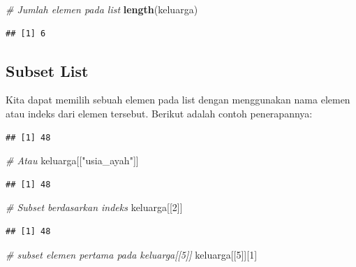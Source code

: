\documentclass[]{book}
\newenvironment{Shaded}{\begin{snugshade}}{\end{snugshade}}
\newcommand{\KeywordTok}[1]{\textcolor[rgb]{0.13,0.29,0.53}{\textbf{#1}}}
\newcommand{\DecValTok}[1]{\textcolor[rgb]{0.00,0.00,0.81}{#1}}
\newcommand{\StringTok}[1]{\textcolor[rgb]{0.31,0.60,0.02}{#1}}
\newcommand{\CommentTok}[1]{\textcolor[rgb]{0.56,0.35,0.01}{\textit{#1}}}
\newcommand{\OperatorTok}[1]{\textcolor[rgb]{0.81,0.36,0.00}{\textbf{#1}}}
\newcommand{\NormalTok}[1]{#1}
\begin{document}
\begin{Shaded}
\begin{Highlighting}[]
\CommentTok{# Jumlah elemen pada list}
\KeywordTok{length}\NormalTok{(keluarga)}
\end{Highlighting}
\end{Shaded}

\begin{verbatim}
## [1] 6
\end{verbatim}

\subsection{Subset List}\label{subset-list}

Kita dapat memilih sebuah elemen pada list dengan menggunakan nama
elemen atau indeks dari elemen tersebut. Berikut adalah contoh
penerapannya:

\begin{Shaded}
\end{Shaded}

\begin{verbatim}
## [1] 48
\end{verbatim}

\begin{Shaded}
\begin{Highlighting}[]
\CommentTok{# Atau}
\NormalTok{keluarga[[}\StringTok{"usia_ayah"}\NormalTok{]]}
\end{Highlighting}
\end{Shaded}

\begin{verbatim}
## [1] 48
\end{verbatim}

\begin{Shaded}
\begin{Highlighting}[]
\CommentTok{# Subset berdasarkan indeks}
\NormalTok{keluarga[[}\DecValTok{2}\NormalTok{]]}
\end{Highlighting}
\end{Shaded}

\begin{verbatim}
## [1] 48
\end{verbatim}

\begin{Shaded}
\begin{Highlighting}[]
\CommentTok{# subset elemen pertama pada keluarga[[5]]}
\NormalTok{keluarga[[}\DecValTok{5}\NormalTok{]][}\DecValTok{1}\NormalTok{]}
\end{Highlighting}
\end{Shaded}
\end{document}
